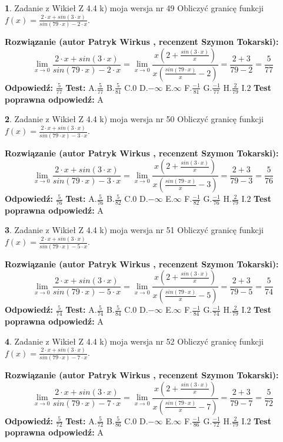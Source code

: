 \documentclass[12pt, a4paper]{article}
\theoremstyle{definition} %
\newtheorem{zad}{}
\newcommand{\zadStart}[1]{\begin{zad}#1\newline}
\newcommand{\zadStop}{\end{zad}}
\newcommand{\rozwStart}[2]{\noindent \textbf{Rozwiązanie (autor #1 , recenzent #2): }\newline}
\newcommand{\rozwStop}{\newline}
\newcommand{\odpStart}{\noindent \textbf{Odpowiedź:}\newline}
\newcommand{\odpStop}{\newline}
\newcommand{\testStart}{\noindent \textbf{Test:}\newline}
\newcommand{\testStop}{\newline}
\newcommand{\kluczStart}{\noindent \textbf{Test poprawna odpowiedź:}\newline}
\newcommand{\kluczStop}{\newline}
\begin{document}
\zadStart{Zadanie z Wikieł Z 4.4 k) moja wersja nr 49}
Obliczyć granicę funkcji $f(x)=\frac{2\cdot x +sin(3\cdot x)}{sin(79\cdot x) -2\cdot x}$.
\zadStop
\rozwStart{Patryk Wirkus}{Szymon Tokarski}
$$\lim\limits_{x\to 0}\frac{2\cdot x +sin(3\cdot x)}{sin(79\cdot x) -2\cdot x}
=\lim\limits_{x\to 0}\frac{x(2+\frac{sin(3\cdot x)}{x})}{x(\frac{sin(79\cdot x)}{x}-2)}
=\frac{2+3}{79-2} = \frac{5}{77}$$
\rozwStop
\odpStart
$\frac{5}{77}$
\odpStop
\testStart
A.$\frac{5}{77}$
B.$\frac{5}{81}$
C.$0$
D.$-\infty$
E.$\infty$
F.$\frac{-1}{81}$
G.$\frac{-1}{77}$
H.$\frac{2}{79}$
I.$2$
\testStop
\kluczStart
A
\kluczStop



\zadStart{Zadanie z Wikieł Z 4.4 k) moja wersja nr 50}
Obliczyć granicę funkcji $f(x)=\frac{2\cdot x +sin(3\cdot x)}{sin(79\cdot x) -3\cdot x}$.
\zadStop
\rozwStart{Patryk Wirkus}{Szymon Tokarski}
$$\lim\limits_{x\to 0}\frac{2\cdot x +sin(3\cdot x)}{sin(79\cdot x) -3\cdot x}
=\lim\limits_{x\to 0}\frac{x(2+\frac{sin(3\cdot x)}{x})}{x(\frac{sin(79\cdot x)}{x}-3)}
=\frac{2+3}{79-3} = \frac{5}{76}$$
\rozwStop
\odpStart
$\frac{5}{76}$
\odpStop
\testStart
A.$\frac{5}{76}$
B.$\frac{5}{82}$
C.$0$
D.$-\infty$
E.$\infty$
F.$\frac{-1}{82}$
G.$\frac{-1}{76}$
H.$\frac{2}{79}$
I.$2$
\testStop
\kluczStart
A
\kluczStop



\zadStart{Zadanie z Wikieł Z 4.4 k) moja wersja nr 51}
Obliczyć granicę funkcji $f(x)=\frac{2\cdot x +sin(3\cdot x)}{sin(79\cdot x) -5\cdot x}$.
\zadStop
\rozwStart{Patryk Wirkus}{Szymon Tokarski}
$$\lim\limits_{x\to 0}\frac{2\cdot x +sin(3\cdot x)}{sin(79\cdot x) -5\cdot x}
=\lim\limits_{x\to 0}\frac{x(2+\frac{sin(3\cdot x)}{x})}{x(\frac{sin(79\cdot x)}{x}-5)}
=\frac{2+3}{79-5} = \frac{5}{74}$$
\rozwStop
\odpStart
$\frac{5}{74}$
\odpStop
\testStart
A.$\frac{5}{74}$
B.$\frac{5}{84}$
C.$0$
D.$-\infty$
E.$\infty$
F.$\frac{-1}{84}$
G.$\frac{-1}{74}$
H.$\frac{2}{79}$
I.$2$
\testStop
\kluczStart
A
\kluczStop



\zadStart{Zadanie z Wikieł Z 4.4 k) moja wersja nr 52}
Obliczyć granicę funkcji $f(x)=\frac{2\cdot x +sin(3\cdot x)}{sin(79\cdot x) -7\cdot x}$.
\zadStop
\rozwStart{Patryk Wirkus}{Szymon Tokarski}
$$\lim\limits_{x\to 0}\frac{2\cdot x +sin(3\cdot x)}{sin(79\cdot x) -7\cdot x}
=\lim\limits_{x\to 0}\frac{x(2+\frac{sin(3\cdot x)}{x})}{x(\frac{sin(79\cdot x)}{x}-7)}
=\frac{2+3}{79-7} = \frac{5}{72}$$
\rozwStop
\odpStart
$\frac{5}{72}$
\odpStop
\testStart
A.$\frac{5}{72}$
B.$\frac{5}{86}$
C.$0$
D.$-\infty$
E.$\infty$
F.$\frac{-1}{86}$
G.$\frac{-1}{72}$
H.$\frac{2}{79}$
I.$2$
\testStop
\kluczStart
A
\kluczStop
\end{document}
